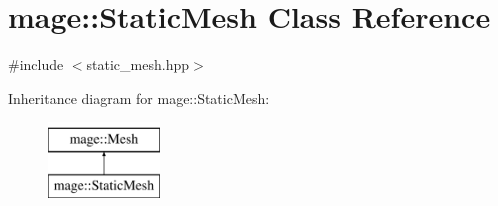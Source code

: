 \hypertarget{classmage_1_1_static_mesh}{}\section{mage\+:\+:Static\+Mesh Class Reference}
\label{classmage_1_1_static_mesh}


{\ttfamily \#include $<$static\+\_\+mesh.\+hpp$>$}

Inheritance diagram for mage\+:\+:Static\+Mesh\+:\begin{figure}[H]
\begin{center}
\leavevmode
\includegraphics[height=2.000000cm]{classmage_1_1_static_mesh}
\end{center}
\end{figure}
